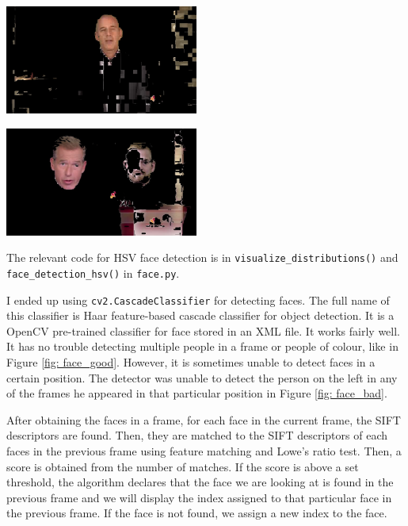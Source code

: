 \documentclass{article}
\begin{document}
\begin{minipage}{0.5\linewidth}
 \label{fig: hsv_good}
\centering
\includegraphics[width=2.5in]{../output/clip_1_hsv/160.jpg}
\end{minipage}
\begin{minipage}{0.5\linewidth}
 \label{fig: hsv_bad}
\centering
\includegraphics[width=2.5in]{../output/clip_1_hsv/050.jpg}
\end{minipage}
\vspace*{10pt}

The relevant code for HSV face detection is in \texttt{visualize\_distributions()} and \texttt{face\_detection\_hsv()} in \texttt{face.py}.

I ended up using \texttt{cv2.CascadeClassifier} for detecting faces. The full name of this classifier is Haar feature-based cascade classifier for object detection. It is a OpenCV pre-trained classifier for face stored in an XML file. It works fairly well. It has no trouble detecting multiple people in a frame or people of colour, like in Figure \ref{fig: face_good}. However, it is sometimes unable to detect faces in a certain position. The detector was unable to detect the person on the left in any of the frames he appeared in that particular position in Figure \ref{fig: face_bad}.

After obtaining the faces in a frame, for each face in the current frame, the SIFT descriptors are found. Then, they are matched to the SIFT descriptors of each faces in the previous frame using feature matching and Lowe's ratio test. Then, a score is obtained from the number of matches. If the score is above a set threshold, the algorithm declares that the face we are looking at is found in the previous frame and we will display the index assigned to that particular face in the previous frame. If the face is not found, we assign a new index to the face.
\end{document}
